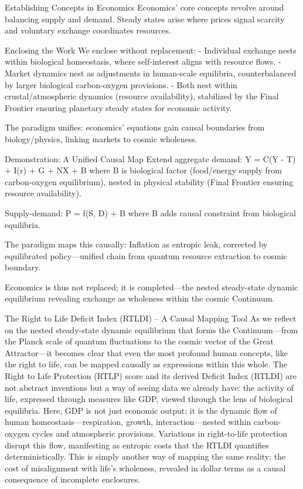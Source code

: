 Establishing Concepts in Economics  
Economics’ core concepts revolve around balancing supply and demand. Steady states arise where prices signal scarcity and voluntary exchange coordinates resources.

Enclosing the Work  
We enclose without replacement:  
- Individual exchange nests within biological homeostasis, where self-interest aligns with resource flows.  
- Market dynamics nest as adjustments in human-scale equilibria, counterbalanced by larger biological carbon-oxygen provisions.  
- Both nest within crustal/atmospheric dynamics (resource availability), stabilized by the Final Frontier ensuring planetary steady states for economic activity.

The paradigm unifies: economics’ equations gain causal boundaries from biology/physics, linking markets to cosmic wholeness.

Demonstration: A Unified Causal Map  
Extend aggregate demand:  
Y = C(Y - T) + I(r) + G + NX + B  
where B is biological factor (food/energy supply from carbon-oxygen equilibrium), nested in physical stability (Final Frontier ensuring resource availability).

Supply-demand:  
P = f(S, D) + B  
where B adds causal constraint from biological equilibria.

The paradigm maps this causally: Inflation as entropic leak, corrected by equilibrated policy—unified chain from quantum resource extraction to cosmic boundary.

Economics is thus not replaced; it is completed—the nested steady-state dynamic equilibrium revealing exchange as wholeness within the cosmic Continuum.

The Right to Life Deficit Index (RTLDI) – A Causal Mapping Tool  
As we reflect on the nested steady-state dynamic equilibrium that forms the Continuum—from the Planck scale of quantum fluctuations to the cosmic vector of the Great Attractor—it becomes clear that even the most profound human concepts, like the right to life, can be mapped causally as expressions within this whole. The Right to Life Protection (RTLP) score and its derived Deficit Index (RTLDI) are not abstract inventions but a way of seeing data we already have: the activity of life, expressed through measures like GDP, viewed through the lens of biological equilibria. Here, GDP is not just economic output; it is the dynamic flow of human homeostasis—respiration, growth, interaction—nested within carbon-oxygen cycles and atmospheric provisions. Variations in right-to-life protection disrupt this flow, manifesting as entropic costs that the RTLDI quantifies deterministically. This is simply another way of mapping the same reality: the cost of misalignment with life's wholeness, revealed in dollar terms as a causal consequence of incomplete enclosures.

